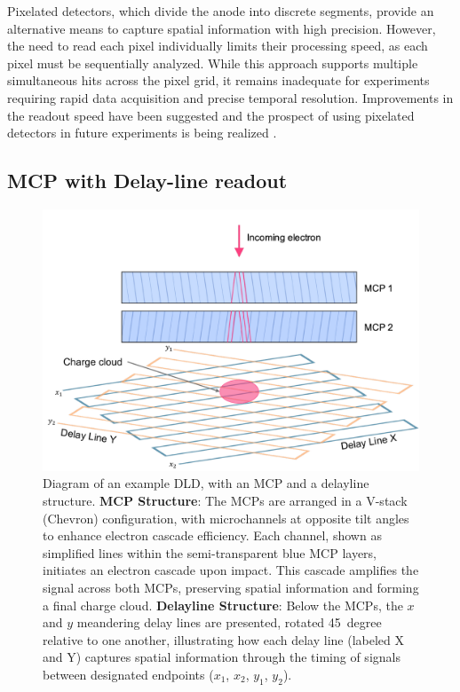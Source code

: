 Pixelated detectors, which divide the anode into discrete segments, provide an alternative means to capture spatial information with high precision. However, the need to read each pixel individually limits their processing speed, as each pixel must be sequentially analyzed. While this approach supports multiple simultaneous hits across the pixel grid, it remains inadequate for experiments requiring rapid data acquisition and precise temporal resolution. Improvements in the readout speed have been suggested and the prospect of using pixelated detectors in future experiments is being realized .

\subsection*{MCP with Delay-line readout}
\begin{figure}
    \centering
    \includegraphics[width=0.9\linewidth]{images/dld.pdf}
    \caption{Diagram of an example \gls{DLD}, with an \gls{MCP} and a delayline structure. \textbf{\gls{MCP} Structure}: The \glspl{MCP} are arranged in a V-stack (Chevron) configuration, with microchannels at opposite tilt angles to enhance electron cascade efficiency. Each channel, shown as simplified lines within the semi-transparent blue \gls{MCP} layers, initiates an electron cascade upon impact. This cascade amplifies the signal across both \glspl{MCP}, preserving spatial information and forming a final charge cloud. \textbf{Delayline Structure}: Below the \glspl{MCP}, the $x$ and $y$ meandering delay lines are presented, rotated \qty{45}{degree} relative to one another, illustrating how each delay line (labeled X and Y) captures spatial information through the timing of signals between designated endpoints ($x_1$, $x_2$, $y_1$, $y_2$).}
    \label{fig:dld}
\end{figure}
